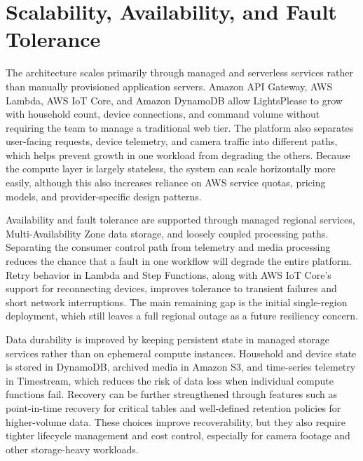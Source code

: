 \section{Scalability, Availability, and Fault Tolerance}

The architecture scales primarily through managed and serverless services rather than manually provisioned application servers. Amazon API Gateway, AWS Lambda, AWS IoT Core, and Amazon DynamoDB allow LightsPlease to grow with household count, device connections, and command volume without requiring the team to manage a traditional web tier. The platform also separates user-facing requests, device telemetry, and camera traffic into different paths, which helps prevent growth in one workload from degrading the others. Because the compute layer is largely stateless, the system can scale horizontally more easily, although this also increases reliance on AWS service quotas, pricing models, and provider-specific design patterns.

Availability and fault tolerance are supported through managed regional services, Multi-Availability Zone data storage, and loosely coupled processing paths. Separating the consumer control path from telemetry and media processing reduces the chance that a fault in one workflow will degrade the entire platform. Retry behavior in Lambda and Step Functions, along with AWS IoT Core's support for reconnecting devices, improves tolerance to transient failures and short network interruptions. The main remaining gap is the initial single-region deployment, which still leaves a full regional outage as a future resiliency concern.

Data durability is improved by keeping persistent state in managed storage services rather than on ephemeral compute instances. Household and device state is stored in DynamoDB, archived media in Amazon S3, and time-series telemetry in Timestream, which reduces the risk of data loss when individual compute functions fail. Recovery can be further strengthened through features such as point-in-time recovery for critical tables and well-defined retention policies for higher-volume data. These choices improve recoverability, but they also require tighter lifecycle management and cost control, especially for camera footage and other storage-heavy workloads.